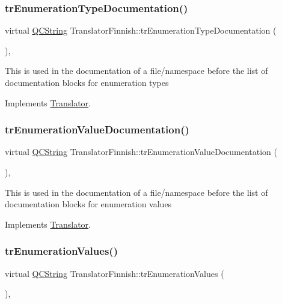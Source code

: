 \subsubsection{\texorpdfstring{trEnumerationTypeDocumentation()}{trEnumerationTypeDocumentation()}}
{\footnotesize\ttfamily virtual \mbox{\hyperlink{class_q_c_string}{Q\+C\+String}} Translator\+Finnish\+::tr\+Enumeration\+Type\+Documentation (\begin{DoxyParamCaption}{ }\end{DoxyParamCaption})\hspace{0.3cm}{\ttfamily [inline]}, {\ttfamily [virtual]}}

This is used in the documentation of a file/namespace before the list of documentation blocks for enumeration types 

Implements \mbox{\hyperlink{class_translator}{Translator}}.

\mbox{\label{class_translator_finnish_a4a6e091d9b6d3211229869e5c69c50db}} 
\subsubsection{\texorpdfstring{trEnumerationValueDocumentation()}{trEnumerationValueDocumentation()}}
{\footnotesize\ttfamily virtual \mbox{\hyperlink{class_q_c_string}{Q\+C\+String}} Translator\+Finnish\+::tr\+Enumeration\+Value\+Documentation (\begin{DoxyParamCaption}{ }\end{DoxyParamCaption})\hspace{0.3cm}{\ttfamily [inline]}, {\ttfamily [virtual]}}

This is used in the documentation of a file/namespace before the list of documentation blocks for enumeration values 

Implements \mbox{\hyperlink{class_translator}{Translator}}.

\mbox{\label{class_translator_finnish_a5892fa1dc138e1d7ec4498f0fefa48f0}} 
\subsubsection{\texorpdfstring{trEnumerationValues()}{trEnumerationValues()}}
{\footnotesize\ttfamily virtual \mbox{\hyperlink{class_q_c_string}{Q\+C\+String}} Translator\+Finnish\+::tr\+Enumeration\+Values (\begin{DoxyParamCaption}{ }\end{DoxyParamCaption})\hspace{0.3cm}{\ttfamily [inline]}, {\ttfamily [virtual]}}

